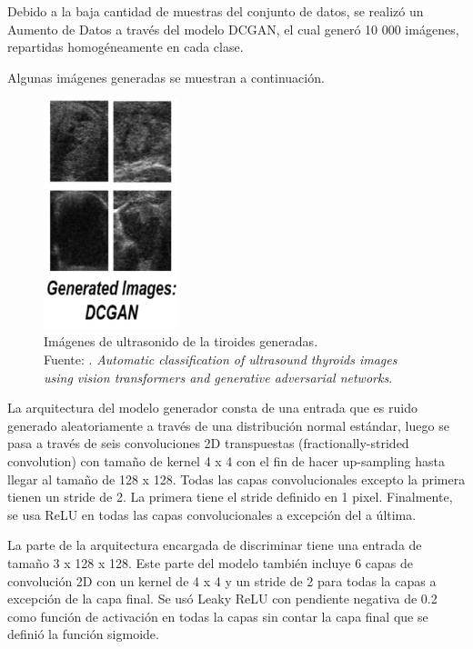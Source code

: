 Debido a la baja cantidad de muestras del conjunto de datos, se realizó un Aumento de Datos a través del modelo DCGAN, el cual generó 10 000 imágenes, repartidas homogéneamente en cada clase.

Algunas imágenes generadas se muestran a continuación.

\begin{figure}[H]
	\begin{center}
		\includegraphics[width=0.35\textwidth]{2/figures/vitpaper6_part1.png}
		\caption[Imágenes de ultrasonido de la tiroides generadas]{Imágenes de ultrasonido de la tiroides generadas. \\
		Fuente: \cite{pr_JERBI2023autoclassViTGAN}. \textit{Automatic classification of ultrasound thyroids images using vision transformers and generative adversarial networks}.}
		\label{2:fig122}
	\end{center}
\end{figure}

La arquitectura del modelo generador consta de una entrada que es ruido generado aleatoriamente a través de una distribución normal estándar, luego se pasa a través de seis convoluciones 2D transpuestas (fractionally-strided convolution) con tamaño de kernel 4 x 4 con el fin de hacer up-sampling hasta llegar al tamaño de 128 x 128. Todas las capas convolucionales excepto la primera tienen un stride de 2. La primera tiene el stride definido en 1 pixel. Finalmente, se usa ReLU en todas las capas convolucionales a excepción del a última. 

La parte de la arquitectura encargada de discriminar tiene una entrada de tamaño 3 x 128 x 128. Este parte del modelo también incluye 6 capas de convolución 2D con un kernel de 4 x 4 y un stride de 2 para todas la capas a excepción de la capa final. Se usó Leaky ReLU con pendiente negativa de 0.2 como función de activación en todas la capas sin contar la capa final que se definió la función sigmoide.

